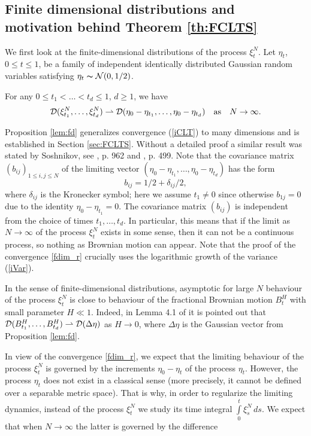\documentclass{article}
\numberwithin{equation}{section}
\newcommand{\DD}{{\cal D}}
\newcommand{\NN}{{\cal N}}
\newcommand{\de}{\delta}
\newcommand{\De}{\Delta}
\newcommand{\ra}{\rightarrow}
\newcommand{\volna}{\thicksim}
\newcommand{\raw}{\rightharpoonup}
\newcommand{\ili}{\int\limits}
\newcommand{\lbl}{\label}
\newcommand{\ass}{\quad\mbox{as}\quad}
\newcommand{\rprop}{Proposition \nolinebreak}
\newcommand{\rsec}{Section \nolinebreak}
\newcommand{\bee}{\begin{equation}}
\newcommand{\eee}{\end{equation}}
\newcommand{\bpp}{\begin{prop}}
\newcommand{\epp}{\end{prop}}
\newcommand{\brr}{\begin{rem}}
\newcommand{\err}{\end{rem}}
\begin{document}
\subsection{Finite dimensional distributions and motivation behind Theorem \ref{th:FCLTS}}

We first look at the finite-dimensional distributions of the process $\xi^N_t$.
Let $\eta_t$, $0\leq t \leq 1$, be a family of independent identically distributed Gaussian random variables satisfying $\eta_t\volna\NN(0,1/2)$.  
\bpp\lbl{lem:fd}
For any $0\leq t_1<\ldots<t_d\leq 1$, $d\geq 1$, we have
\bee\lbl{fdim_r}
\DD(\xi^N_{t_1},\ldots,\xi^N_{t_d}) \raw \DD(\eta_0-\eta_{t_1},\ldots,\eta_0-\eta_{t_d}) \ass N\ra\infty.
\eee
\epp
Proposition \ref{lem:fd} generalizes convergence (\ref{iCLT}) to many dimensions and is established in \rsec \ref{sec:FCLTS}.
Without a detailed proof a similar result was stated by Soshnikov, see \cite{So00}, p. 962 and \cite{SoAB}, p. 499.
Note that the covariance matrix $(b_{ij})_{1\leq i,j\leq N}$ of the limiting vector $(\eta_0-\eta_{t_1},\ldots,\eta_0-\eta_{t_d})$ has the form
\bee\lbl{iCov}
b_{ij}= 1/2+ \de_{ij}/2,
\eee
where $\de_{ij}$ is the Kronecker symbol; here we assume $t_1\neq 0$ since otherwise $b_{1j}=0$ due to the identity $\eta_0-\eta_{t_1}=0$.
The covariance matrix $(b_{ij})$ is independent
from the choice of times $t_1,\ldots, t_d$.
In particular, this means that if the limit as $N\ra\infty$
of the process $\xi^N_t$
exists in some sense,
then it can not be a continuous process,
so nothing as Brownian motion can appear.
Note that the proof of the convergence \eqref{fdim_r}
crucially uses the logarithmic growth of the variance (\ref{iVar}).
\brr\lbl{rem:fB} In the sense of finite-dimensional distributions,
asymptotic for large $N$ behaviour of the process $\xi^N_t$
is close to behaviour of the fractional Brownian motion $B^H_t$
with small parameter $H\ll 1$.
Indeed, in Lemma 4.1 of \cite{BMNZ} it is pointed out that
$\DD(B^H_{t_1},\ldots,B^H_{t_d})\raw \DD(\De\eta)$
as $H\ra 0$,
where  $\De\eta$ is the Gaussian vector from \rprop\ref{lem:fd}.
\err
In view of the convergence \eqref{fdim_r}, we expect that the limiting behaviour of the process $\xi^N_t$
is governed by the increments $\eta_0-\eta_t$ of the process $\eta_t$.
However, the process $\eta_t$ does not exist in a classical sense
(more precisely, it cannot be defined over a separable metric space).
That is why, in order to regularize the limiting dynamics,
instead of the process $\xi^N_t$
we study its time integral $\ili_0^t \xi^N_s \,ds$.
We expect that when $N\ra\infty$ the latter is governed by the difference
\end{document}
